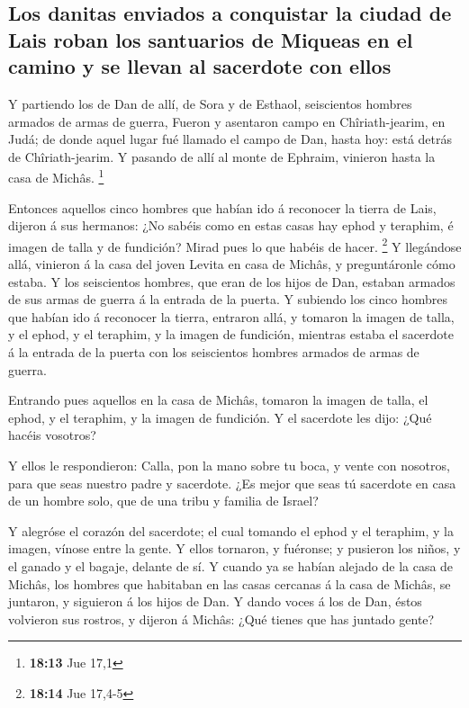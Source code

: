 \hypertarget{los-danitas-enviados-a-conquistar-la-ciudad-de-lais-roban-los-santuarios-de-miqueas-en-el-camino-y-se-llevan-al-sacerdote-con-ellos}{%
\subsection{Los danitas enviados a conquistar la ciudad de Lais roban
los santuarios de Miqueas en el camino y se llevan al sacerdote con
ellos}\label{los-danitas-enviados-a-conquistar-la-ciudad-de-lais-roban-los-santuarios-de-miqueas-en-el-camino-y-se-llevan-al-sacerdote-con-ellos}}

 Y partiendo los de Dan de allí, de Sora y de Esthaol,
seiscientos hombres armados de armas de guerra,  Fueron y
asentaron campo en Chîriath-jearim, en Judá; de donde aquel lugar fué
llamado el campo de Dan, hasta hoy: está detrás de Chîriath-jearim.
 Y pasando de allí al monte de Ephraim, vinieron hasta la
casa de Michâs. \footnote{\textbf{18:13} Jue 17,1}

 Entonces aquellos cinco hombres que habían ido á
reconocer la tierra de Lais, dijeron á sus hermanos: ¿No sabéis como en
estas casas hay ephod y teraphim, é imagen de talla y de fundición?
Mirad pues lo que habéis de hacer. \footnote{\textbf{18:14} Jue 17,4-5}
 Y llegándose allá, vinieron á la casa del joven Levita
en casa de Michâs, y preguntáronle cómo estaba.  Y los
seiscientos hombres, que eran de los hijos de Dan, estaban armados de
sus armas de guerra á la entrada de la puerta.  Y
subiendo los cinco hombres que habían ido á reconocer la tierra,
entraron allá, y tomaron la imagen de talla, y el ephod, y el teraphim,
y la imagen de fundición, mientras estaba el sacerdote á la entrada de
la puerta con los seiscientos hombres armados de armas de guerra.

 Entrando pues aquellos en la casa de Michâs, tomaron la
imagen de talla, el ephod, y el teraphim, y la imagen de fundición. Y el
sacerdote les dijo: ¿Qué hacéis vosotros?

 Y ellos le respondieron: Calla, pon la mano sobre tu
boca, y vente con nosotros, para que seas nuestro padre y sacerdote. ¿Es
mejor que seas tú sacerdote en casa de un hombre solo, que de una tribu
y familia de Israel?

 Y alegróse el corazón del sacerdote; el cual tomando el
ephod y el teraphim, y la imagen, vínose entre la gente. 
Y ellos tornaron, y fuéronse; y pusieron los niños, y el ganado y el
bagaje, delante de sí.  Y cuando ya se habían alejado de
la casa de Michâs, los hombres que habitaban en las casas cercanas á la
casa de Michâs, se juntaron, y siguieron á los hijos de Dan.
 Y dando voces á los de Dan, éstos volvieron sus rostros,
y dijeron á Michâs: ¿Qué tienes que has juntado gente?

